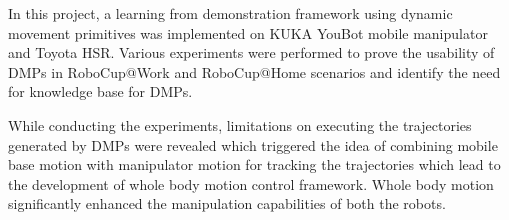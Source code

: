 \par In this project, a learning from demonstration framework using dynamic movement primitives was implemented on KUKA YouBot mobile manipulator and Toyota HSR. Various experiments were performed to prove the usability of DMPs in RoboCup@Work and RoboCup@Home scenarios and identify the need for knowledge base for DMPs. 

While conducting the experiments, limitations on executing the trajectories generated by DMPs were revealed which triggered the idea of combining mobile base motion with manipulator motion for tracking the trajectories which lead to the development of whole body motion control framework. Whole body motion significantly enhanced the manipulation capabilities of both the robots.   

